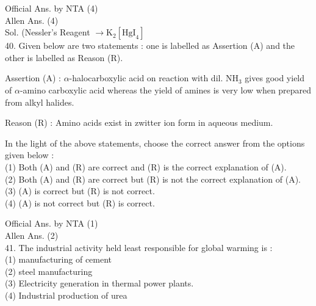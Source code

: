 \documentclass[10pt]{article}
\begin{document}
Official Ans. by NTA (4)\\
Allen Ans. (4)\\
Sol. (Nessler's Reagent \(\rightarrow \mathrm{K}_{2}\left[\mathrm{HgI}_{4}\right]\)\\
40. Given below are two statements : one is labelled as Assertion (A) and the other is labelled as Reason (R).

Assertion (A) : \(\alpha\)-halocarboxylic acid on reaction with dil. \(\mathrm{NH}_{3}\) gives good yield of \(\alpha\)-amino carboxylic acid whereas the yield of amines is very low when prepared from alkyl halides.

Reason (R) : Amino acids exist in zwitter ion form in aqueous medium.

In the light of the above statements, choose the correct answer from the options given below :\\
(1) Both (A) and (R) are correct and (R) is the correct explanation of (A).\\
(2) Both (A) and (R) are correct but (R) is not the correct explanation of (A).\\
(3) (A) is correct but (R) is not correct.\\
(4) (A) is not correct but (R) is correct.

Official Ans. by NTA (1)\\
Allen Ans. (2)\\
41. The industrial activity held least responsible for global warming is :\\
(1) manufacturing of cement\\
(2) steel manufacturing\\
(3) Electricity generation in thermal power plants.\\
(4) Industrial production of urea
\end{document}
